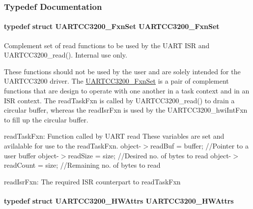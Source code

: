 \subsubsection{Typedef Documentation}
\paragraph[{U\+A\+R\+T\+C\+C3200\+\_\+\+Fxn\+Set}]{\setlength{\rightskip}{0pt plus 5cm}typedef struct {\bf U\+A\+R\+T\+C\+C3200\+\_\+\+Fxn\+Set}  {\bf U\+A\+R\+T\+C\+C3200\+\_\+\+Fxn\+Set}}\label{_u_a_r_t_c_c3200_8h_a752d0ee3dd233dc675dd2338f365f3df}


Complement set of read functions to be used by the U\+A\+R\+T I\+S\+R and U\+A\+R\+T\+C\+C3200\+\_\+read(). Internal use only. 

These functions should not be used by the user and are solely intended for the U\+A\+R\+T\+C\+C3200 driver. The \hyperlink{struct_u_a_r_t_c_c3200___fxn_set}{U\+A\+R\+T\+C\+C3200\+\_\+\+Fxn\+Set} is a pair of complement functions that are design to operate with one another in a task context and in an I\+S\+R context. The read\+Task\+Fxn is called by U\+A\+R\+T\+C\+C3200\+\_\+read() to drain a circular buffer, whereas the read\+Isr\+Fxn is used by the U\+A\+R\+T\+C\+C3200\+\_\+hwi\+Int\+Fxn to fill up the circular buffer.

read\+Task\+Fxn\+: Function called by U\+A\+R\+T read These variables are set and avilalable for use to the read\+Task\+Fxn. object-\/$>$read\+Buf = buffer; //\+Pointer to a user buffer object-\/$>$read\+Size = size; //\+Desired no. of bytes to read object-\/$>$read\+Count = size; //\+Remaining no. of bytes to read

read\+Isr\+Fxn\+: The required I\+S\+R counterpart to read\+Task\+Fxn 
\paragraph[{U\+A\+R\+T\+C\+C3200\+\_\+\+H\+W\+Attrs}]{\setlength{\rightskip}{0pt plus 5cm}typedef struct {\bf U\+A\+R\+T\+C\+C3200\+\_\+\+H\+W\+Attrs}  {\bf U\+A\+R\+T\+C\+C3200\+\_\+\+H\+W\+Attrs}}\label{_u_a_r_t_c_c3200_8h_a4314d1c1487378758af75f900158e582}


